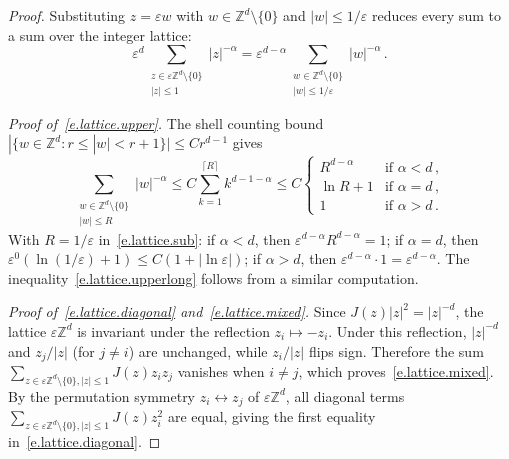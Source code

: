 \documentclass[11pt]{amsart}
\theoremstyle{plain}
\theoremstyle{definition}
\theoremstyle{remark}
\newcommand{\Zd}{\mathbb{Z}^d}
\newcommand{\eps}{\varepsilon}
\begin{document}
	\begin{proof}
		Substituting $z = \eps w$ with $w \in \Zd \setminus \{0\}$ and $|w| \le 1/\eps$ reduces every sum to a sum over the integer lattice:
		\begin{equation}
			\label{e.lattice.sub}
			\eps^d \sum_{\substack{z \in \eps \Zd \setminus \{0\} \\ |z| \le 1}} |z|^{-\alpha}
			=
			\eps^{d-\alpha} \sum_{\substack{w \in \Zd \setminus \{0\} \\ |w| \le 1/\eps}} |w|^{-\alpha}\,.
		\end{equation}
		
		\emph{Proof of~\eqref{e.lattice.upper}.}
		The shell counting bound $|\{w \in \Zd : r \le |w| < r+1\}| \le Cr^{d-1}$ gives
		\[
		\sum_{\substack{w \in \Zd \setminus \{0\} \\ |w| \le R}} |w|^{-\alpha}
		\le
		C \sum_{k=1}^{\lceil R \rceil} k^{d-1-\alpha}
		\le
		C
		\begin{cases}
			R^{d-\alpha} &\text{if } \alpha < d\,,\\
			\ln R + 1 &\text{if } \alpha = d\,,\\
			1 &\text{if } \alpha > d\,.
		\end{cases}
		\]
		With $R = 1/\eps$ in~\eqref{e.lattice.sub}: if $\alpha < d$, then $\eps^{d-\alpha} R^{d-\alpha} = 1$; if $\alpha = d$, then $\eps^0(\ln(1/\eps)+1) \le C(1 + \left| \ln\eps \right|)$; if $\alpha > d$, then $\eps^{d-\alpha} \cdot 1 = \eps^{d-\alpha}$. The inequality~\eqref{e.lattice.upperlong} follows from a similar computation.
		
		\emph{Proof of~\eqref{e.lattice.diagonal} and~\eqref{e.lattice.mixed}.}
		Since $J(z)|z|^2 = |z|^{-d}$, the lattice $\eps\Zd$ is invariant under the reflection $z_i \mapsto -z_i$.
		Under this reflection, $|z|^{-d}$ and $z_j/|z|$ (for $j \ne i$) are unchanged, while $z_i/|z|$ flips sign.
		Therefore the sum $\sum_{z \in \eps\Zd \setminus \{0\},|z| \le 1} J(z) z_i z_j$ vanishes when $i \ne j$, which proves~\eqref{e.lattice.mixed}.
		By the permutation symmetry $z_i \leftrightarrow z_j$ of $\eps\Zd$, all diagonal terms $\sum_{z \in \eps\Zd \setminus \{0\},|z| \le 1} J(z) z_i^2$ are equal, giving the first equality in~\eqref{e.lattice.diagonal}.
		

\end{proof}
\end{document}
